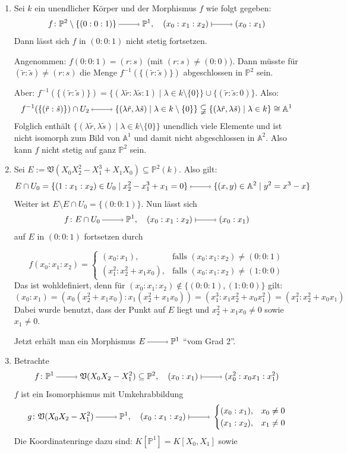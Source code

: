 \documentclass[a4paper,12pt]{scrbook}
\def\A{\mathbb{A}}
\def\V{\mathfrak{V}}
\def\P{\mathbb{P}}
\newcommand{\ra}{\raisebox{-1pt}{\tikz{\draw[thin,shorten >=3pt, ->] (0,0) node{\hspace*{-2pt}} -- node{} (1,0);}}\penalty1000\relax}
\renewcommand{\mapsto}{\raisebox{-1pt}{\tikz{\draw[thin,shorten >=3pt, |->] (0,0) node{\hspace*{0pt}} -- node{} (1,0);}}\penalty1000\relax}
\newcommand{\lra}{\raisebox{-1pt}{\tikz{\draw[thin,shorten >=3pt, <->] (0,0) node{\hspace*{-2pt}} -- node{} (1,0);}}\penalty1000\relax}
\begin{document}
\begin{bsp}\label{2.6.3}
\begin{enumerate}
  \item{} Sei $k$ ein unendlicher Körper und der Morphismus $f$ wie folgt gegeben:
\[f\colon \P^2\setminus \{(0:0:1)\}\ra \P^1, \quad (x_0:x_1:x_2)\mapsto (x_0:x_1)\]
Dann lässt sich $f$ in $(0:0:1)$ nicht stetig fortsetzen.

Angenommen: $f(0:0:1)=(r:s)$ (mit $(r:s)\neq (0:0)$). Dann müsste für $(\tilde{r}:\tilde{s})\neq (r:s)$ die Menge $f^{-1}(\{(\tilde{r}:\tilde{s})\})$ abgeschlossen in $\P^2$ sein.

Aber: $f^{-1}(\{(\tilde{r}:\tilde{s})\})=\{(\lambda \tilde{r}:\lambda \tilde{s}:1) \mid \lambda \in k\setminus \{0\}\}\cup\{(\tilde{r}:\tilde{s}:0)\}$. Also:
\[f^{-1}(\{(\tilde{r}:\tilde{s})\})\cap U_2 \lra \{(\lambda \tilde{r},\lambda \tilde{s}) \mid \lambda \in k\setminus \{0\}\} \subsetneqq \{(\lambda \tilde{r},\lambda \tilde{s}) \mid \lambda \in k\} \cong \A^1\]
Folglich enthält $\{(\lambda \tilde{r}, \lambda \tilde{s}) \mid \lambda \in k\setminus \{0\}\}$ unendlich viele Elemente und ist nicht isomorph zum Bild von $\A^1$ und damit nicht abgeschlossen in $\A^2$. Also kann $f$ nicht stetig auf ganz $\P^2$ sein.
  \item{} Sei $E:=\V(X_0X_2^2-X_1^3+X_1X_0) \subseteq \P^2(k)$. Also gilt: 
  \[E\cap U_0=\{(1:x_1:x_2) \in U_0 \mid x_2^2-x_1^3+x_1=0\} \lra \{(x,y)\in \A^2 \mid y^2=x^3-x\}\]
Weiter ist $E\setminus E\cap U_0=\{(0:0:1)\}$. Nun lässt sich 
\[f \colon E\cap U_0\ra \P^1, \quad (x_0:x_1:x_2)\mapsto (x_0:x_1)\] auf $E$ in $(0:0:1)$ fortsetzen durch 

\[f(x_0:x_1:x_2)=\begin{cases} (x_0:x_1),&\text{falls } (x_0:x_1:x_2)\neq (0:0:1)\\ (x_1^2:x_2^2+x_1x_0),&\text{falls } (x_0:x_1:x_2)\neq (1:0:0) \end{cases}\] 
Das ist wohldefiniert, denn für $(x_0:x_1:x_2) \notin \{(0:0:1),(1:0:0)\}$ gilt:
\[(x_0:x_1)=(x_0(x_2^2+x_1x_0):x_1(x_2^2+x_1x_0))=(x_1^3:x_1x_2^2+x_0x_1^2)=(x_1^2:x_2^2+x_0x_1)\]
Dabei wurde benutzt, dass der Punkt auf $E$ liegt und $x_2^2+x_1x_0 \neq 0$ sowie $x_1 \neq 0$.

Jetzt erhält man ein Morphismus $E\ra \P^1$ \enquote{vom Grad 2}.
  \item{} Betrachte
\[f\colon \P^1\ra \V(X_0X_2-X_1^2)\subseteq \P^2, \quad (x_0:x_1)\mapsto (x_0^2:x_0x_1:x_1^2)\]
$f$ ist ein Isomorphismus mit Umkehrabbildung
\[g\colon\V(X_0X_2-X_1^2)\ra \P^1, \quad (x_0:x_1:x_2)\mapsto \begin{cases} (x_0:x_1), &x_0 \neq 0\\(x_1:x_2), &x_1 \neq 0 \end{cases} \]
Die Koordinatenringe dazu sind: $K[\P^1]=K[X_0,X_1]$ sowie


\end{enumerate}
\end{bsp}
\end{document}
